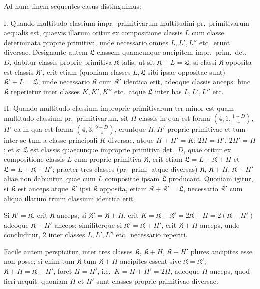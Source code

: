 \documentclass[12pt,a4paper]{article}
\theoremstyle{plain}
\theoremstyle{definition}
\theoremstyle{remark}
\theoremstyle{problemstyle}
\begin{document}
Ad hunc finem sequentes casus distinguimus:

I. Quando multitudo classium impr.\ primitivarum multitudini pr.\ primitivarum aequalis est, quaevis illarum oritur ex compositione classis $L$ cum classe determinata proprie primitiva, unde necessario omnes $L, L', L''$ etc.\ erunt diversae. Designante autem $\mathfrak{L}$ classem quamcunque ancipitem impr.\ prim.\ det.\ $D$, dabitur classis proprie primitiva $\mathfrak{K}$ talis, ut sit $\mathfrak{K} + L = \mathfrak{L}$; si classi $\mathfrak{K}$ opposita est classis $\mathfrak{K}'$, erit etiam (quoniam classes $L, \mathfrak{L}$ sibi ipsae oppositae sunt) $\mathfrak{K}' + L = \mathfrak{L}$, unde necessario $\mathfrak{K}$ cum $\mathfrak{K}'$ identica erit, adeoque classis anceps: hinc $\mathfrak{K}$ reperietur inter classes $K, K', K''$ etc.\ atque $\mathfrak{L}$ inter has $L, L', L''$ etc.

II. Quando multitudo classium improprie primitivarum ter minor est quam multitudo classium pr.\ primitivarum, sit $H$ classis in qua est forma $(4, 1, \frac{1 - D}{4})$, $H'$ ea in qua est forma $(4, 3, \frac{9 - D}{4})$, eruntque $H, H'$ proprie primitivae et tum inter se tum a classe principali $K$ diversae, atque $H + H' = K$; $2H = H'$, $2H' = H$; et si $\mathfrak{L}$ est classis quaecunque improprie primitiva det.\ $D$, quae oritur ex compositione classis $L$ cum proprie primitiva $\mathfrak{K}$, erit etiam $\mathfrak{L} = L + \mathfrak{K} + H$ et $\mathfrak{L} = L + \mathfrak{K} + H'$; praeter tres classes (pr.\ prim.\ atque diversas) $\mathfrak{K}$, $\mathfrak{K} + H$, $\mathfrak{K} + H'$ aliae non dabuntur, quae cum $L$ compositae ipsam $\mathfrak{L}$ producant. Quoniam igitur, si $\mathfrak{K}$ est anceps atque $\mathfrak{K}'$ ipsi $\mathfrak{K}$ opposita, etiam $\mathfrak{K} + \mathfrak{K}' = \mathfrak{L}$, necessario $\mathfrak{K}'$ cum aliqua illarum trium classium identica erit.

Si $\mathfrak{K}' = \mathfrak{K}$, erit $\mathfrak{K}$ anceps; si $\mathfrak{K}' = \mathfrak{K} + H$, erit $K = \mathfrak{K} + \mathfrak{K}' = 2\mathfrak{K} + H = 2(\mathfrak{K} + H')$ adeoque $\mathfrak{K} + H'$ anceps; similiterque si $\mathfrak{K}' = \mathfrak{K} + H'$, erit $\mathfrak{K} + H$ anceps, unde concluditur, 2 inter classes $L, L', L''$ etc.\ necessario reperiri.

Facile autem perspicitur, inter tres classes $\mathfrak{K}$, $\mathfrak{K} + H$, $\mathfrak{K} + H'$ plures ancipites esse non posse; si enim tum $\mathfrak{K}$ tum $\mathfrak{K} + H$ ancipites essent sive $\mathfrak{K} = \mathfrak{K}'$, $\mathfrak{K} + H = \mathfrak{K} + H'$, foret $H = H'$, i.e.\ $K = H + H' = 2H$, adeoque $H$ anceps, quod fieri nequit, quoniam $H$ et $H'$ sunt classes proprie primitivae diversae.
\end{document}
